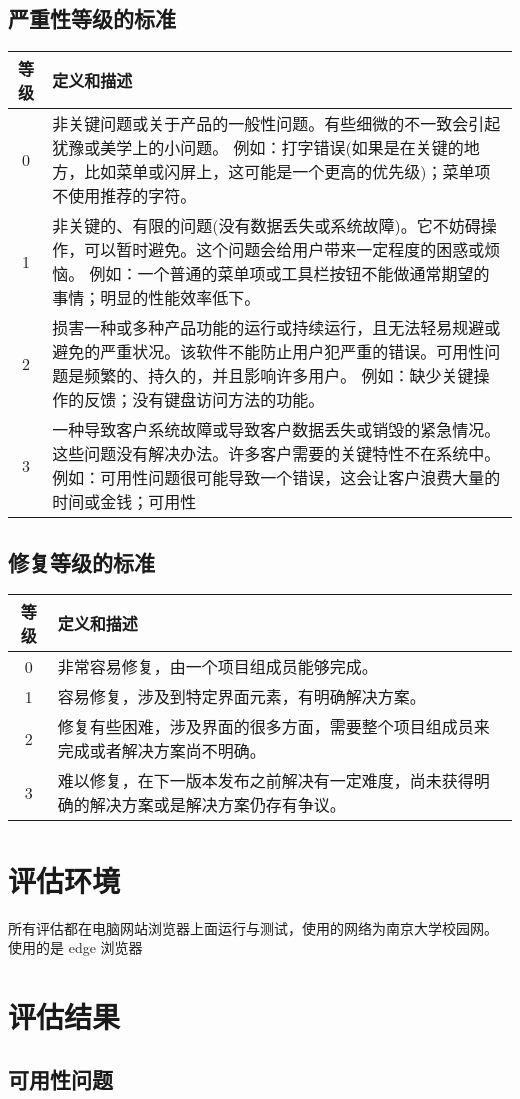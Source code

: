 \documentclass[a4paper,12pt]{article}
\begin{document}
\subsection{严重性等级的标准}
\begin{tabular}{|c|p{10cm}|}
    \hline
    等级 & 定义和描述 \\
    \hline
    0 & 非关键问题或关于产品的一般性问题。有些细微的不一致会引起犹豫或美学上的小问题。 例如：打字错误(如果是在关键的地方，比如菜单或闪屏上，这可能是一个更高的优先级)；菜单项不使用推荐的字符。 \\
    1 & 非关键的、有限的问题(没有数据丢失或系统故障)。它不妨碍操作，可以暂时避免。这个问题会给用户带来一定程度的困惑或烦恼。 例如：一个普通的菜单项或工具栏按钮不能做通常期望的事情；明显的性能效率低下。 \\
    2 & 损害一种或多种产品功能的运行或持续运行，且无法轻易规避或避免的严重状况。该软件不能防止用户犯严重的错误。可用性问题是频繁的、持久的，并且影响许多用户。 例如：缺少关键操作的反馈；没有键盘访问方法的功能。 \\
    3 & 一种导致客户系统故障或导致客户数据丢失或销毁的紧急情况。这些问题没有解决办法。许多客户需要的关键特性不在系统中。 例如：可用性问题很可能导致一个错误，这会让客户浪费大量的时间或金钱；可用性 \\
\end{tabular}

\subsection{修复等级的标准}
\begin{tabular}{|c|p{10cm}|}
    \hline
    等级 & 定义和描述 \\
    \hline
    0 & 非常容易修复，由一个项目组成员能够完成。 \\
    1 & 容易修复，涉及到特定界面元素，有明确解决方案。 \\
    2 & 修复有些困难，涉及界面的很多方面，需要整个项目组成员来完成或者解决方案尚不明确。 \\
    3 & 难以修复，在下一版本发布之前解决有一定难度，尚未获得明确的解决方案或是解决方案仍存有争议。 \\
    \hline
    \end{tabular}
    
\section{评估环境}
所有评估都在电脑网站浏览器上面运行与测试，使用的网络为南京大学校园网。
使用的是 edge 浏览器
\section{评估结果}
\subsection{可用性问题}
\end{document}
